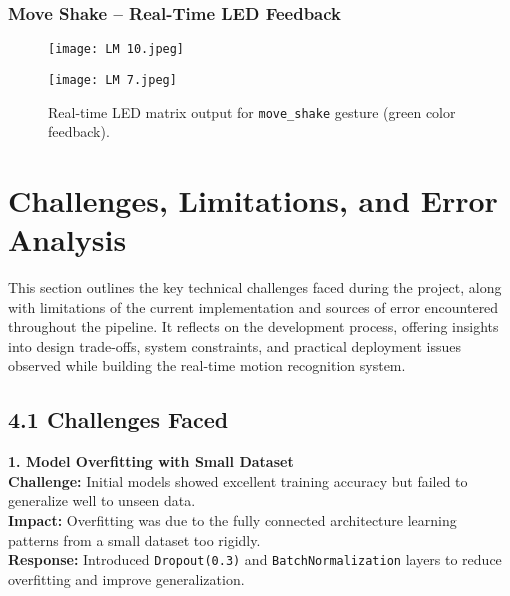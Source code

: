 \documentclass[a4paper,12pt]{article}
\begin{document}
\subsubsection*{Move Shake – Real-Time LED Feedback}

\begin{figure}[H]
    \centering
    \begin{minipage}[b]{0.45\linewidth}
        \centering
        \texttt{[image: LM 10.jpeg]}
    \end{minipage}
    \hfill
    \begin{minipage}[b]{0.45\linewidth}
        \centering
        \texttt{[image: LM 7.jpeg]}
    \end{minipage}
    \caption{Real-time LED matrix output for \texttt{move\_shake} gesture (green color feedback).}
    \label{fig:move_shake_live}
\end{figure}

\section{Challenges, Limitations, and Error Analysis}

This section outlines the key technical challenges faced during the project, along with limitations of the current implementation and sources of error encountered throughout the pipeline. It reflects on the development process, offering insights into design trade-offs, system constraints, and practical deployment issues observed while building the real-time motion recognition system.

\subsection*{4.1 Challenges Faced}

\textbf{1. Model Overfitting with Small Dataset} \\
\textbf{Challenge:} Initial models showed excellent training accuracy but failed to generalize well to unseen data. \\
\textbf{Impact:} Overfitting was due to the fully connected architecture learning patterns from a small dataset too rigidly. \\
\textbf{Response:} Introduced \texttt{Dropout(0.3)} and \texttt{BatchNormalization} layers to reduce overfitting and improve generalization.

\vspace{1em}
\end{document}

